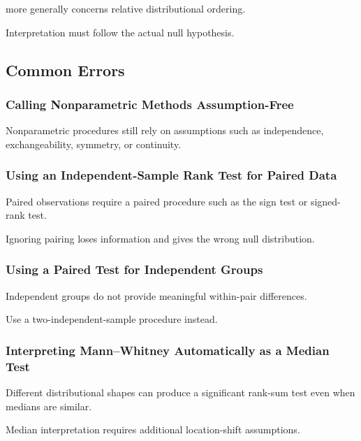 more generally concerns relative distributional ordering.

Interpretation must follow the actual null hypothesis.

\subsection{Common Errors}
\label{subsec:nonparametric-common-errors}

\subsubsection{Calling Nonparametric Methods Assumption-Free}

Nonparametric procedures still rely on assumptions such as independence,
exchangeability, symmetry, or continuity.

\subsubsection{Using an Independent-Sample Rank Test for Paired Data}

Paired observations require a paired procedure such as the sign test or
signed-rank test.

Ignoring pairing loses information and gives the wrong null distribution.

\subsubsection{Using a Paired Test for Independent Groups}

Independent groups do not provide meaningful within-pair differences.

Use a two-independent-sample procedure instead.

\subsubsection{Interpreting Mann--Whitney Automatically as a Median Test}

Different distributional shapes can produce a significant rank-sum test
even when medians are similar.

Median interpretation requires additional location-shift assumptions.

